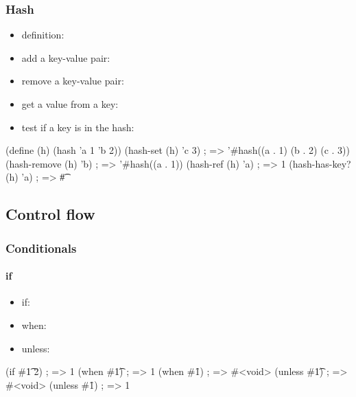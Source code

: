 \documentclass[a4paper,landscape,10pt]{article}
\begin{document}
\begin{multicols*}{2}
  \subsubsection{Hash}

  \begin{itemize}
    \item definition: 
    \item add a key-value pair: 
    \item remove a key-value pair: 
    \item get a value from a key: 
    \item test if a key is in the hash: 
  \end{itemize}

  \begin{racket}
(define (h) (hash 'a 1 'b 2))
(hash-set (h) 'c 3) ; => '#hash((a . 1) (b . 2) (c . 3))
(hash-remove (h) 'b) ; => '#hash((a . 1))
(hash-ref (h) 'a) ; => 1
(hash-has-key? (h) 'a) ; => #\t
  \end{racket}

  \breakcolumn

  \subsection{Control flow}

  \subsubsection{Conditionals}

  \paragraph{if}

  \begin{itemize}
    \item if: 
    \item when: 
    \item unless: 
  \end{itemize}

  \begin{racket}
(if #\t 1 2) ; => 1
(when #\t 1) ; => 1
(when #\f 1) ; => #<void>
(unless #\t 1) ; => #<void>
(unless #\f 1) ; => 1
  \end{racket}


\end{multicols*}
\end{document}
